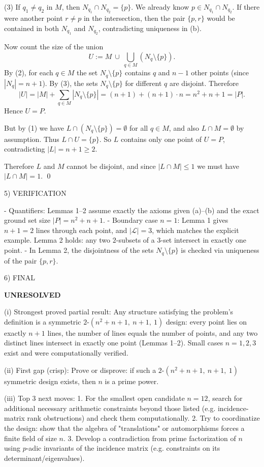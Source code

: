 (3) If $q_1\ne q_2$ in $M$, then $N_{q_1}\cap N_{q_2}=\{p\}$.
We already know $p\in N_{q_1}\cap N_{q_2}$. If there were another point $r\ne p$ in the intersection, then the pair $\{p,r\}$ would be contained in both $N_{q_1}$ and $N_{q_2}$, contradicting uniqueness in (b).

Now count the size of the union
\[
U := M\ \cup\ \bigcup_{q\in M} (N_q\setminus\{p\}).
\]
By (2), for each $q\in M$ the set $N_q\setminus\{p\}$ contains $q$ and $n-1$ other points (since $|N_q|=n+1$).
By (3), the sets $N_q\setminus\{p\}$ for different $q$ are disjoint.
Therefore
\[
|U| = |M| + \sum_{q\in M} |N_q\setminus\{p\}| 
= (n+1) + (n+1)\cdot n 
= n^2+n+1 = |P|.
\]
Hence $U=P$.

But by (1) we have $L\cap (N_q\setminus\{p\})=\emptyset$ for all $q\in M$, and also $L\cap M=\emptyset$ by assumption. Thus $L\cap U = \{p\}$.
So $L$ contains only one point of $U=P$, contradicting $|L|=n+1\ge 2$.

Therefore $L$ and $M$ cannot be disjoint, and since $|L\cap M|\le 1$ we must have $|L\cap M|=1$.
\qed

5) VERIFICATION

- Quantifiers: Lemmas 1--2 assume exactly the axioms given (a)--(b) and the exact ground set size $|P|=n^2+n+1$.
- Boundary case $n=1$: Lemma 1 gives $n+1=2$ lines through each point, and $|\mathcal L|=3$, which matches the explicit example. Lemma 2 holds: any two $2$-subsets of a $3$-set intersect in exactly one point.
- In Lemma 2, the disjointness of the sets $N_q\setminus\{p\}$ is checked via uniqueness of the pair $\{p,r\}$.

6) FINAL

\textbf{UNRESOLVED}

(i) Strongest proved partial result: Any structure satisfying the problem's definition is a symmetric $2$-$(n^2+n+1,\ n+1,\ 1)$ design: every point lies on exactly $n+1$ lines, the number of lines equals the number of points, and any two distinct lines intersect in exactly one point (Lemmas 1--2). Small cases $n=1,2,3$ exist and were computationally verified.

(ii) First gap (crisp): Prove or disprove: if such a $2$-$(n^2+n+1,\ n+1,\ 1)$ symmetric design exists, then $n$ is a prime power.

(iii) Top 3 next moves:
  1. For the smallest open candidate $n=12$, search for additional necessary arithmetic constraints beyond those listed (e.g. incidence-matrix rank obstructions) and check them computationally.
  2. Try to coordinatize the design: show that the algebra of "translations" or automorphisms forces a finite field of size $n$.
  3. Develop a contradiction from prime factorization of $n$ using $p$-adic invariants of the incidence matrix (e.g. constraints on its determinant/eigenvalues).

